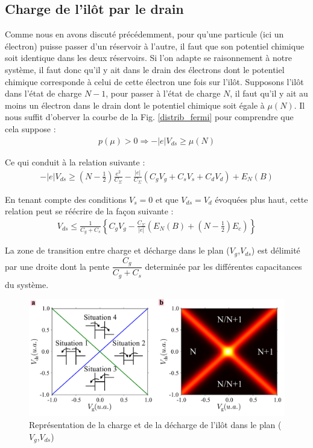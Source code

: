 \subsection{Charge de l'il\^ot par le drain}
Comme nous en avons discuté précédemment, pour qu'une particule (ici un électron) puisse passer d'un réservoir à l'autre, il faut que son potentiel chimique soit identique dans les deux réservoirs. Si l'on adapte se raisonnement à notre système, il faut donc qu'il y ait dans le drain des électrons dont le potentiel chimique corresponde à celui de cette électron une fois sur l'il\^ot. Supposons l'il\^ot dans l'état de charge $N-1$, pour passer à l'état de charge $N$, il faut qu'il y ait au moins un électron dans le drain dont le potentiel chimique soit égale à $\mu(N)$. Il nous suffit d'oberver la courbe de la Fig. \ref{distrib_fermi} pour comprendre que cela suppose :
\begin{eqnarray}
p(\mu) > 0 \Longrightarrow  -|e|V_{ds} \geq \mu(N) \nonumber
\end{eqnarray}

Ce qui conduit à la relation suivante :
\begin{eqnarray}
-|e|V_{ds} \geq (N-\frac{1}{2})\frac{e^2}{C_{\Sigma}}
-
\frac{|e|}{C_{\Sigma}}(C_gV_g + C_sV_s + C_dV_d)
+
E_N(B) \nonumber
\end{eqnarray}

En tenant compte des conditions $V_s= 0$ et que $V_{ds} = V_d$ évoquées plus haut, cette relation peut se réécrire de la façon suivante :
\begin{eqnarray}
V_{ds} \leq \frac{1}{C_g + C_s} \left\lbrace C_gV_g - \frac{C_{\Sigma}}{|e|}\left(E_N(B) + (N-\frac{1}{2})E_c \right) \right\rbrace 
\end{eqnarray}

La zone de transition entre charge et décharge dans le plan ($V_g$,$V_{ds}$) est délimité par une droite dont la pente $\dfrac{C_g}{C_g + C_s}$ determinée par les différentes capacitances du système.


\begin{figure}
\includegraphics[scale=0.5]{Theorie/Transport/figure3/figure3.pdf} 
\caption{Représentation de la charge et de la décharge de l'il\^ot dans le plan ($V_g$,$V_{ds}$)}
\label{charge_discharge}
\end{figure}



